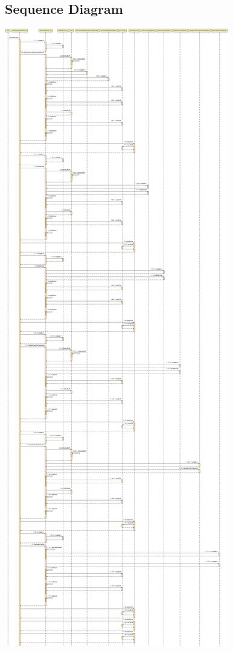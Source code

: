 \subsection{Sequence Diagram}
\includegraphics[width=0.5\columnwidth]{WA-workflix-HW1/images/RestDispatcherServlet_processUser.jpg}